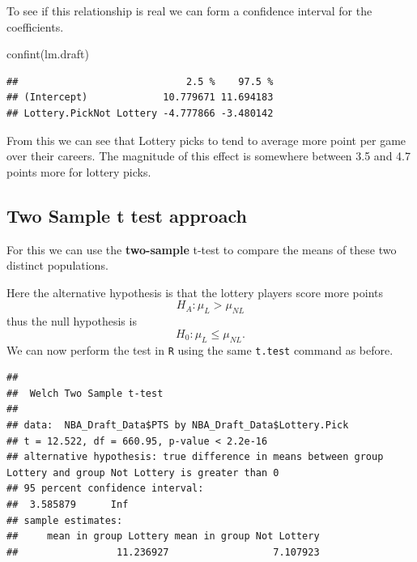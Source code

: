 \documentclass[
]{book}
\newenvironment{Shaded}{\begin{snugshade}}{\end{snugshade}}
\newcommand{\AttributeTok}[1]{\textcolor[rgb]{0.77,0.63,0.00}{#1}}
\newcommand{\FunctionTok}[1]{\textcolor[rgb]{0.00,0.00,0.00}{#1}}
\newcommand{\NormalTok}[1]{#1}
\newcommand{\SpecialCharTok}[1]{\textcolor[rgb]{0.00,0.00,0.00}{#1}}
\newcommand{\StringTok}[1]{\textcolor[rgb]{0.31,0.60,0.02}{#1}}
\theoremstyle{definition}
\theoremstyle{definition}
\theoremstyle{definition}
\theoremstyle{definition}
\theoremstyle{remark}
\begin{document}
To see if this relationship is real we can form a confidence interval for the coefficients.

\begin{Shaded}
\begin{Highlighting}[]
\FunctionTok{confint}\NormalTok{(lm.draft)}
\end{Highlighting}
\end{Shaded}

\begin{verbatim}
##                             2.5 %    97.5 %
## (Intercept)             10.779671 11.694183
## Lottery.PickNot Lottery -4.777866 -3.480142
\end{verbatim}

From this we can see that Lottery picks to tend to average more point per game over their careers. The magnitude of this effect is somewhere between 3.5 and 4.7 points more for lottery picks.

\hypertarget{two-sample-t-test-approach}{%
\subsection{Two Sample t test approach}\label{two-sample-t-test-approach}}

For this we can use the \textbf{two-sample} t-test to compare the means of these two distinct populations.

Here the alternative hypothesis is that the lottery players score more points \[H_A: \mu_L > \mu_{NL}\] thus the null hypothesis is \[H_0: \mu_L \leq \mu_{NL}.\]
We can now perform the test in \texttt{R} using the same \texttt{t.test} command as before.

\begin{Shaded}
\end{Shaded}

\begin{verbatim}
## 
##  Welch Two Sample t-test
## 
## data:  NBA_Draft_Data$PTS by NBA_Draft_Data$Lottery.Pick
## t = 12.522, df = 660.95, p-value < 2.2e-16
## alternative hypothesis: true difference in means between group Lottery and group Not Lottery is greater than 0
## 95 percent confidence interval:
##  3.585879      Inf
## sample estimates:
##     mean in group Lottery mean in group Not Lottery 
##                 11.236927                  7.107923
\end{verbatim}
\end{document}
